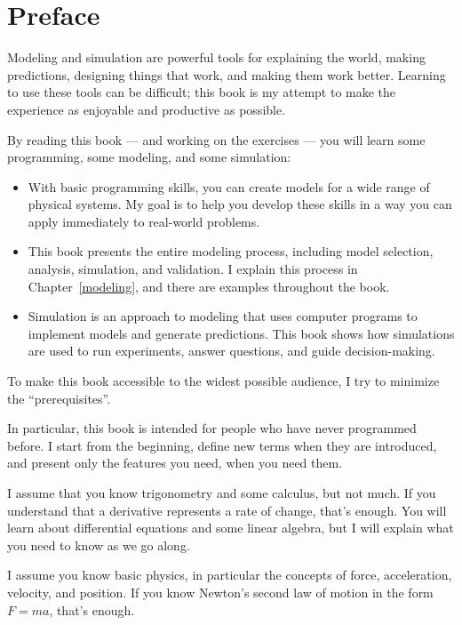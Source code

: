 \documentclass[main.tex]{subfiles}
\begin{document}
\chapter{Preface}

Modeling and simulation are powerful tools for explaining the world, making predictions, designing things that work, and making them work better.  Learning to use these tools can be difficult; this book is my attempt to make the experience as enjoyable and productive as possible.

By reading this book --- and working on the exercises --- you will learn some programming, some modeling, and some simulation:

\begin{itemize}

\item With basic programming skills, you can create models for a wide range of physical systems.
My goal is to help you develop these skills in a way you can apply immediately to real-world problems.

\item This book presents the entire modeling process, including model selection, analysis, simulation, and validation.  I explain this process in Chapter~\ref{modeling}, and there are examples throughout the book.

\item Simulation is an approach to modeling that uses computer programs to  implement models and generate predictions.  This book shows how simulations are used to run experiments, answer questions, and guide decision-making.

\end{itemize}

To make this book accessible to the widest possible audience, I try to minimize the ``prerequisites''.  

In particular, this book is intended for people who have never programmed before.  I start from the beginning, define new terms when they are introduced, and present only the features you need, when you need them.

I assume that you know trigonometry and some calculus, but not much.  If you understand that a derivative represents a rate of change, that's enough.  You will learn about differential equations and some linear algebra, but I will explain what you need to know as we go along.

I assume you know basic physics, in particular the concepts of force, acceleration, velocity, and position.  If you know Newton's second law of motion in the form $F = m a$, that's enough.
\end{document}
